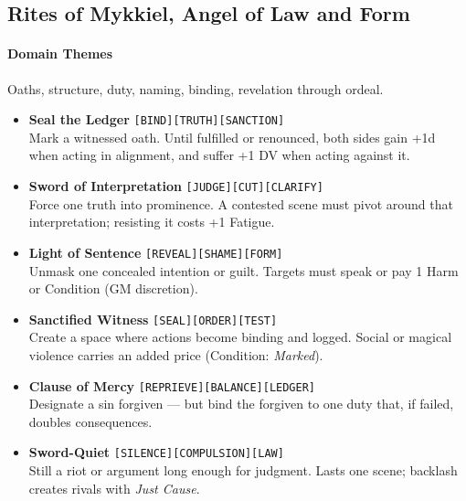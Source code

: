 \documentclass[11pt]{article}
\begin{document}
\subsection{Rites of Mykkiel, Angel of Law and Form}

\paragraph{Domain Themes}
Oaths, structure, duty, naming, binding, revelation through ordeal.

\begin{itemize}
  \item \textbf{Seal the Ledger} \;\texttt{[BIND][TRUTH][SANCTION]}\\
  Mark a witnessed oath. Until fulfilled or renounced, both sides gain
  +1d when acting in alignment, and suffer +1 DV when acting against it.

  \item \textbf{Sword of Interpretation} \;\texttt{[JUDGE][CUT][CLARIFY]}\\
  Force one truth into prominence. A contested scene must pivot around
  that interpretation; resisting it costs +1 Fatigue.

  \item \textbf{Light of Sentence} \;\texttt{[REVEAL][SHAME][FORM]}\\
  Unmask one concealed intention or guilt. Targets must speak or pay
  1 Harm or Condition (GM discretion).

  \item \textbf{Sanctified Witness} \;\texttt{[SEAL][ORDER][TEST]}\\
  Create a space where actions become binding and logged. Social or
  magical violence carries an added price (Condition: \emph{Marked}).

  \item \textbf{Clause of Mercy} \;\texttt{[REPRIEVE][BALANCE][LEDGER]}\\
  Designate a sin forgiven --- but bind the forgiven to one duty that,
  if failed, doubles consequences.

  \item \textbf{Sword-Quiet} \;\texttt{[SILENCE][COMPULSION][LAW]}\\
  Still a riot or argument long enough for judgment. Lasts one scene;
  backlash creates rivals with \emph{Just Cause}.
\end{itemize}
\end{document}
